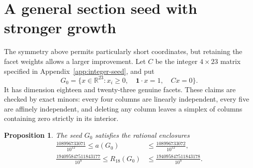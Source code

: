 \documentclass[11pt]{article}
\newtheorem{proposition}[theorem]{Proposition}
\newcommand{\R}{\mathbb R}
\begin{document}
\section{A general section seed with stronger growth}\label{sec:general-section}
The symmetry above permits particularly short coordinates, but retaining
the facet weights allows a larger improvement. Let $C$ be the integer
$4\times23$ matrix specified in Appendix~\ref{app:integer-seed}, and put
\[
 G_0=\{x\in\R^{23}:x_i\ge0,\quad \boldsymbol1\cdot x=1,\quad Cx=0\}.
\]
It has dimension eighteen and twenty-three genuine facets. These claims
are checked by exact minors: every four columns are linearly independent,
every five are affinely independent, and deleting any column leaves a
simplex of columns containing zero strictly in its interior.

\begin{proposition}\label{prop:general-state}
The seed $G_0$ satisfies the rational enclosures
\begin{align}
 \frac{108996733071}{10^{12}}\le a(G_0)
    &\le\frac{108996733072}{10^{12}},\label{eq:general-a}\\
 \frac{194095847511843177}{10^9}\le R_{18}(G_0)
    &\le\frac{194095847511843178}{10^9}.\label{eq:general-R}
\end{align}
\end{proposition}
\end{document}
